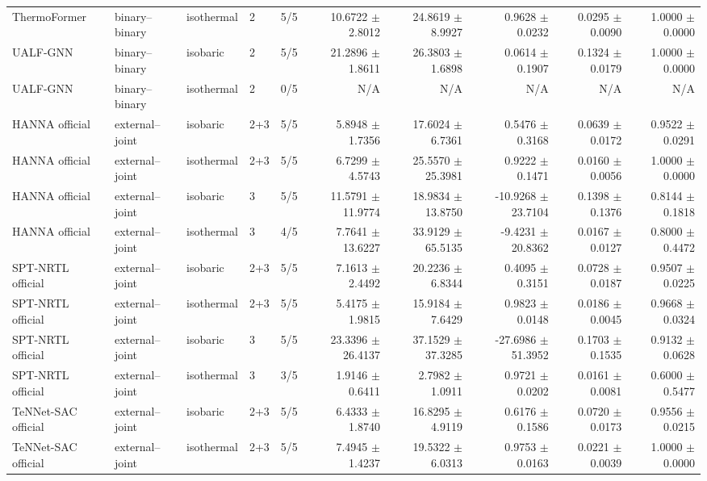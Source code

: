 \begin{tabular}{lllllrrrrr}
ThermoFormer & binary--binary & isothermal & 2 & 5/5 & 10.6722 $\pm$ 2.8012 & 24.8619 $\pm$ 8.9927 & 0.9628 $\pm$ 0.0232 & 0.0295 $\pm$ 0.0090 & 1.0000 $\pm$ 0.0000 \\
UALF-GNN & binary--binary & isobaric & 2 & 5/5 & 21.2896 $\pm$ 1.8611 & 26.3803 $\pm$ 1.6898 & 0.0614 $\pm$ 0.1907 & 0.1324 $\pm$ 0.0179 & 1.0000 $\pm$ 0.0000 \\
UALF-GNN & binary--binary & isothermal & 2 & 0/5 & N/A & N/A & N/A & N/A & N/A \\
HANNA official & external--joint & isobaric & 2+3 & 5/5 & 5.8948 $\pm$ 1.7356 & 17.6024 $\pm$ 6.7361 & 0.5476 $\pm$ 0.3168 & 0.0639 $\pm$ 0.0172 & 0.9522 $\pm$ 0.0291 \\
HANNA official & external--joint & isothermal & 2+3 & 5/5 & 6.7299 $\pm$ 4.5743 & 25.5570 $\pm$ 25.3981 & 0.9222 $\pm$ 0.1471 & 0.0160 $\pm$ 0.0056 & 1.0000 $\pm$ 0.0000 \\
HANNA official & external--joint & isobaric & 3 & 5/5 & 11.5791 $\pm$ 11.9774 & 18.9834 $\pm$ 13.8750 & -10.9268 $\pm$ 23.7104 & 0.1398 $\pm$ 0.1376 & 0.8144 $\pm$ 0.1818 \\
HANNA official & external--joint & isothermal & 3 & 4/5 & 7.7641 $\pm$ 13.6227 & 33.9129 $\pm$ 65.5135 & -9.4231 $\pm$ 20.8362 & 0.0167 $\pm$ 0.0127 & 0.8000 $\pm$ 0.4472 \\
SPT-NRTL official & external--joint & isobaric & 2+3 & 5/5 & 7.1613 $\pm$ 2.4492 & 20.2236 $\pm$ 6.8344 & 0.4095 $\pm$ 0.3151 & 0.0728 $\pm$ 0.0187 & 0.9507 $\pm$ 0.0225 \\
SPT-NRTL official & external--joint & isothermal & 2+3 & 5/5 & 5.4175 $\pm$ 1.9815 & 15.9184 $\pm$ 7.6429 & 0.9823 $\pm$ 0.0148 & 0.0186 $\pm$ 0.0045 & 0.9668 $\pm$ 0.0324 \\
SPT-NRTL official & external--joint & isobaric & 3 & 5/5 & 23.3396 $\pm$ 26.4137 & 37.1529 $\pm$ 37.3285 & -27.6986 $\pm$ 51.3952 & 0.1703 $\pm$ 0.1535 & 0.9132 $\pm$ 0.0628 \\
SPT-NRTL official & external--joint & isothermal & 3 & 3/5 & 1.9146 $\pm$ 0.6411 & 2.7982 $\pm$ 1.0911 & 0.9721 $\pm$ 0.0202 & 0.0161 $\pm$ 0.0081 & 0.6000 $\pm$ 0.5477 \\
TeNNet-SAC official & external--joint & isobaric & 2+3 & 5/5 & 6.4333 $\pm$ 1.8740 & 16.8295 $\pm$ 4.9119 & 0.6176 $\pm$ 0.1586 & 0.0720 $\pm$ 0.0173 & 0.9556 $\pm$ 0.0215 \\
TeNNet-SAC official & external--joint & isothermal & 2+3 & 5/5 & 7.4945 $\pm$ 1.4237 & 19.5322 $\pm$ 6.0313 & 0.9753 $\pm$ 0.0163 & 0.0221 $\pm$ 0.0039 & 1.0000 $\pm$ 0.0000 \\

\end{tabular}
